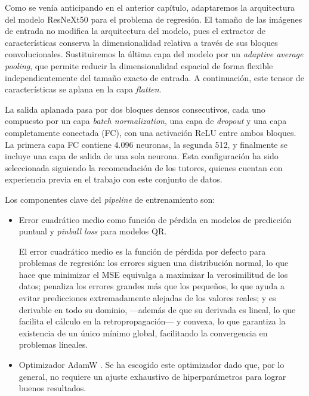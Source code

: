 Como se venía anticipando en el anterior capítulo, adaptaremos la arquitectura del modelo ResNeXt50 para el problema de regresión. El tamaño de las imágenes de entrada no modifica la arquitectura del modelo, pues el extractor de características conserva la dimensionalidad relativa a través de sus bloques convolucionales. Sustituiremos la última capa del modelo por un \textit{adaptive average pooling}, que permite reducir la dimensionalidad espacial de forma flexible independientemente del tamaño exacto de entrada. A continuación, este tensor de características se aplana en la capa \textit{flatten}.

La salida aplanada pasa por dos bloques densos consecutivos, cada uno compuesto por un capa \textit{batch normalization}, una capa de \textit{dropout} y una capa completamente conectada (FC), con una activación ReLU entre ambos bloques. La primera capa FC contiene 4.096 neuronas, la segunda 512, y finalmente se incluye una capa de salida de una sola neurona. Esta configuración ha sido seleccionada siguiendo la recomendación de los tutores, quienes cuentan con experiencia previa en el trabajo con este conjunto de datos.


Los componentes clave del \textit{pipeline} de entrenamiento son:

\begin{itemize}

    \item Error cuadrático medio como función de pérdida en modelos de predicción puntual y \textit{pinball loss} para modelos QR. 

    El error cuadrático medio es la función de pérdida por defecto para problemas de regresión: los errores siguen una distribución normal, lo que hace que minimizar el MSE equivalga a maximizar la verosimilitud de los datos; penaliza los errores grandes más que los pequeños, lo que ayuda a evitar predicciones extremadamente alejadas de los valores reales; y es derivable en todo su dominio, ---además de que su derivada es lineal, lo que facilita el cálculo en la retropropagación--- y convexa, lo que garantiza la existencia de un único mínimo global, facilitando la convergencia en problemas lineales. 
        
    \item Optimizador AdamW \cite{loshchilov2017}. Se ha escogido este optimizador dado que, por lo general, no requiere un ajuste exhaustivo de hiperparámetros para lograr buenos resultados. 
    
\end{itemize}

